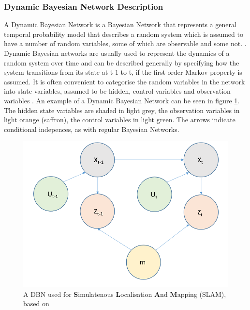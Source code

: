 \subsubsection{Dynamic Bayesian Network Description}
A Dynamic Bayesian Network is a Bayesian Network that represents a general temporal probability model that describes a random system which is assumed to have a number of random variables, some of which are observable and some not. \cite{AIAMA}. Dynamic Bayesian networks are usually used to represent the dynamics of a random system over time and can be described generally by specifying how the system transitions from its state at t-1 to t, if the first order Markov property is assumed. It is often convenient to categorise the random variables in the network into state variables, assumed to be hidden, control variables and observation variables . An example of a Dynamic Bayesian Network can be seen in figure \ref{fig:2TDBNExample}. The hidden state variables are shaded in light grey, the observation variables in light orange (saffron), the control variables in light green. The arrows indicate conditional indepences, as with regular Bayesian Networks.

\begin{figure}
    \centering
    \includegraphics[width = 0.5\linewidth]{Chapters/MultiAgentTargetDetection/BayesianFiltering/Figs/DBNs/2DBNExample.png}
    \caption{A DBN used for \textbf{S}imulatenous \textbf{L}ocalisation \textbf{A}nd \textbf{M}apping (SLAM), based on \cite[p.~311]{Thrun:2005:ProbabilisticRobotics}}
    \label{fig:2TDBNExample}
\end{figure}


\subsubsection{}